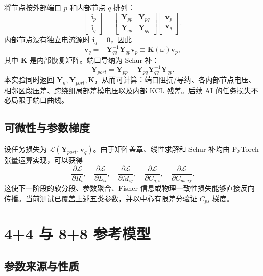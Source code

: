 \documentclass[11pt,a4paper]{ctexart}
\newcommand{\mat}[1]{\bm{#1}}
\begin{document}
将节点按外部端口 \(p\) 和内部节点 \(q\) 排列：
\begin{equation}
\begin{bmatrix}\mat i_p\\\mat i_q\end{bmatrix}=
\begin{bmatrix}\mat Y_{pp}&\mat Y_{pq}\\\mat Y_{qp}&\mat Y_{qq}\end{bmatrix}
\begin{bmatrix}\mat v_p\\\mat v_q\end{bmatrix}.
\end{equation}
内部节点没有独立电流源时 \(\mat i_q=0\)，因此
\begin{equation}
\mat v_q=-\mat Y_{qq}^{-1}\mat Y_{qp}\mat v_p
\equiv\mat K(\omega)\mat v_p,
\end{equation}
其中 \(\mat K\) 是内部恢复矩阵。端口导纳为 Schur 补：
\begin{equation}
\boxed{\mat Y_{port}=\mat Y_{pp}-\mat Y_{pq}\mat Y_{qq}^{-1}\mat Y_{qp}.}
\label{eq:kron}
\end{equation}
本实验同时返回 \(\mat Y_n,\mat Y_{port},\mat K\)，从而可计算：端口阻抗/导纳、各内部节点电压、相邻区段压差、跨绕组局部差模电压以及内部 KCL 残差。后续 AI 的任务损失不必局限于端口曲线。

\subsection{可微性与参数梯度}

设任务损失为 \(\mathcal L(\mat Y_{port},\mat v_q)\)。由于矩阵盖章、线性求解和 Schur 补均由 PyTorch 张量运算实现，可以获得
\[
\frac{\partial\mathcal L}{\partial R_i},\quad
\frac{\partial\mathcal L}{\partial L_{ii}},\quad
\frac{\partial\mathcal L}{\partial M_{ij}},\quad
\frac{\partial\mathcal L}{\partial C_{g,i}},\quad
\frac{\partial\mathcal L}{\partial C_{ps,ij}}.
\]
这使下一阶段的软分段、参数聚合、Fisher 信息或物理一致性损失能够直接反向传播。当前测试已覆盖上述五类参数，并以中心有限差分验证 \(C_{ps}\) 梯度。

\section{4+4 与 8+8 参考模型}

\subsection{参数来源与性质}
\end{document}

